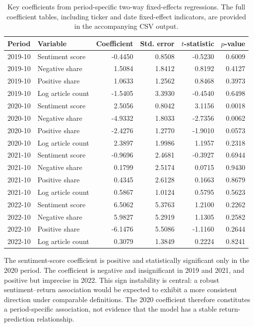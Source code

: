 \documentclass[12pt,a4paper]{article}
\begin{document}
\begin{table}[htbp]
\centering
\scriptsize
\caption{Key coefficients from period-specific two-way fixed-effects regressions. The full coefficient tables, including ticker and date fixed-effect indicators, are provided in the accompanying CSV output.}
\label{tab:panel-key-coefficients-multi-year}
\begin{tabular}{llrrrr}
\toprule
\textbf{Period} & \textbf{Variable} & \textbf{Coefficient} & \textbf{Std. error} & \textbf{$t$-statistic} & \textbf{$p$-value} \\
\midrule
2019-10 & Sentiment score & -0.4450 & 0.8508 & -0.5230 & 0.6009 \\
2019-10 & Negative share & 1.5084 & 1.8412 & 0.8192 & 0.4127 \\
2019-10 & Positive share & 1.0633 & 1.2562 & 0.8468 & 0.3973 \\
2019-10 & Log article count & -1.5405 & 3.3930 & -0.4540 & 0.6498 \\
2020-10 & Sentiment score & 2.5056 & 0.8042 & 3.1156 & 0.0018 \\
2020-10 & Negative share & -4.9332 & 1.8033 & -2.7356 & 0.0062 \\
2020-10 & Positive share & -2.4276 & 1.2770 & -1.9010 & 0.0573 \\
2020-10 & Log article count & 2.3897 & 1.9986 & 1.1957 & 0.2318 \\
2021-10 & Sentiment score & -0.9696 & 2.4681 & -0.3927 & 0.6944 \\
2021-10 & Negative share & 0.1799 & 2.5174 & 0.0715 & 0.9430 \\
2021-10 & Positive share & 0.4345 & 2.6128 & 0.1663 & 0.8679 \\
2021-10 & Log article count & 0.5867 & 1.0124 & 0.5795 & 0.5623 \\
2022-10 & Sentiment score & 6.5062 & 5.3763 & 1.2100 & 0.2262 \\
2022-10 & Negative share & 5.9827 & 5.2919 & 1.1305 & 0.2582 \\
2022-10 & Positive share & -6.1476 & 5.5086 & -1.1160 & 0.2644 \\
2022-10 & Log article count & 0.3079 & 1.3849 & 0.2224 & 0.8241 \\
\bottomrule
\end{tabular}
\end{table}

The sentiment-score coefficient is positive and statistically significant only in the 2020 period. The coefficient is negative and insignificant in 2019 and 2021, and positive but imprecise in 2022. This sign instability is central: a robust sentiment--return association would be expected to exhibit a more consistent direction under comparable definitions. The 2020 coefficient therefore constitutes a period-specific association, not evidence that the model has a stable return-prediction relationship.
\end{document}

